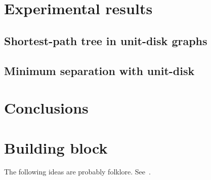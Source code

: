\documentclass[a4paper,USenglish,numberwithinsect]{lipics}
\begin{document}
\section{Experimental results}
\label{sec:experiments}

\subsection{Shortest-path tree in unit-disk graphs}
\label{sec:experiments-sptree}

\subsection{Minimum separation with unit-disk}
\label{sec:experiments-separation}

\section{Conclusions}
\label{sec:conclusions}





\section{Building block}

The following ideas are probably folklore. See~\cite{aa}.
\end{document}
